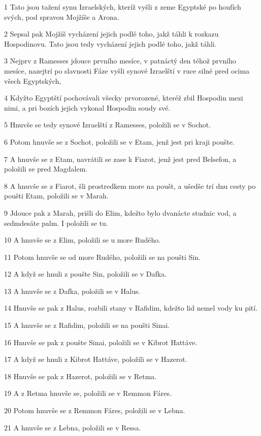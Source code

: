 \par 1 Tato jsou tažení synu Izraelských, kteríž vyšli z zeme Egyptské po houfích svých, pod spravou Mojžíše a Arona.
\par 2 Sepsal pak Mojžíš vycházení jejich podlé toho, jakž táhli k rozkazu Hospodinovu. Tato jsou tedy vycházení jejich podlé toho, jakž táhli.
\par 3 Nejprv z Ramesses jdouce prvního mesíce, v patnáctý den téhož prvního mesíce, nazejtrí po slavnosti Fáze vyšli synové Izraelští v ruce silné pred ocima všech Egyptských,
\par 4 Kdyžto Egyptští pochovávali všecky prvorozené, kteréž zbil Hospodin mezi nimi, a pri bozích jejich vykonal Hospodin soudy své.
\par 5 Hnuvše se tedy synové Izraelští z Ramesses, položili se v Sochot.
\par 6 Potom hnuvše se z Sochot, položili se v Etam, jenž jest pri kraji poušte.
\par 7 A hnuvše se z Etam, navrátili se zase k Fiarot, jenž jest pred Belsefon, a položili se pred Magdalem.
\par 8 A hnuvše se z Fiarot, šli prostredkem more na poušt, a ušedše trí dnu cesty po poušti Etam, položili se v Marah.
\par 9 Jdouce pak z Marah, prišli do Elim, kdežto bylo dvanácte studnic vod, a sedmdesáte palm. I položili se tu.
\par 10 A hnuvše se z Elim, položili se u more Rudého.
\par 11 Potom hnuvše se od more Rudého, položili se na poušti Sin.
\par 12 A když se hnuli z poušte Sin, položili se v Dafka.
\par 13 A hnuvše se z Dafka, položili se v Halus.
\par 14 Hnuvše se pak z Halus, rozbili stany v Rafidim, kdežto lid nemel vody ku pití.
\par 15 A hnuvše se z Rafidim, položili se na poušti Sinai.
\par 16 Hnuvše se pak z poušte Sinai, položili se v Kibrot Hattáve.
\par 17 A když se hnuli z Kibrot Hattáve, položili se v Hazerot.
\par 18 Hnuvše se pak z Hazerot, položili se v Retma.
\par 19 A z Retma hnuvše se, položili se v Remmon Fáres.
\par 20 Potom hnuvše se z Remmon Fáres, položili se v Lebna.
\par 21 A hnuvše se z Lebna, položili se v Ressa.
